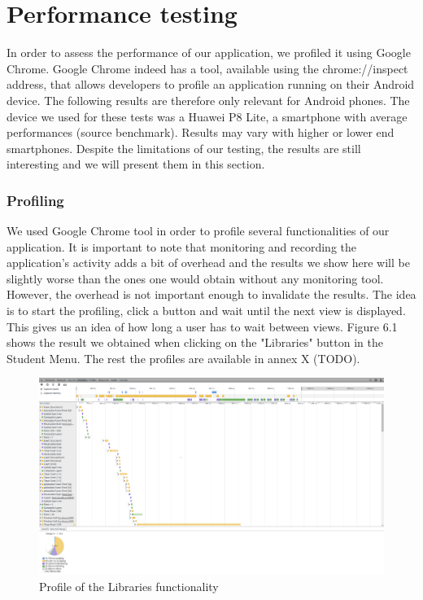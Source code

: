 \documentclass{eplmastersthesis}
\begin{document}
\section{Performance testing}

In order to assess the performance of our application, we profiled it using Google Chrome. Google Chrome indeed has a tool, available using the chrome://inspect address, that allows developers to profile an application running on their Android device. The following results are therefore only relevant for Android phones. The device we used for these tests was a Huawei P8 Lite, a smartphone with average performances (source benchmark). Results may vary with higher or lower end smartphones. Despite the limitations of our testing, the results are still interesting and we will present them in this section.
\subsubsection{Profiling}
We used Google Chrome tool in order to profile several functionalities of our application. It is important to note that monitoring and recording the application's activity adds a bit of overhead and the results we show here will be slightly worse than the ones one would obtain without any monitoring tool. However, the overhead is not important enough to invalidate the results. The idea is to start the profiling, click a button and wait until the next view is displayed. This gives us an idea of how long a user has to wait between views. Figure 6.1 shows the result we obtained when clicking on the "Libraries" button in the Student Menu. The rest the profiles are available in annex X (TODO).\\

\begin{figure}
\centering
\includegraphics[scale = 0.25]{Images/libraries.png}
\caption{Profile of the Libraries functionality}
\end{figure}
\end{document}
